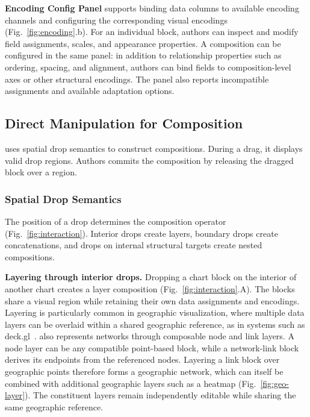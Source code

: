 \textbf{Encoding Config Panel} supports binding data columns to available
encoding channels and configuring the corresponding visual encodings
(Fig.~\ref{fig:encoding}.b). For an individual block, authors can inspect and
modify field assignments, scales, and appearance properties. A composition can
be configured in the same panel: in addition to relationship properties such
as ordering, spacing, and alignment, authors can bind fields to
composition-level axes or other structural encodings. The panel also reports
incompatible assignments and available adaptation options.















\subsection{Direct Manipulation for Composition}

{\system} uses spatial drop semantics to construct compositions. During a drag,
it displays valid drop regions. Authors commits the composition by releasing the
dragged block over a region.

\subsubsection{Spatial Drop Semantics}



The position of a drop determines the composition operator
(Fig.~\ref{fig:interaction}). Interior drops create layers, boundary drops create
concatenations, and drops on internal structural targets create nested
compositions.



\textbf{Layering through interior drops.}
Dropping a chart block on the interior of another chart creates a layer
composition (Fig.~\ref{fig:interaction}.A). The blocks share a visual region
while retaining their own data assignments and encodings. Layering is
particularly common in geographic visualization, where multiple data layers
can be overlaid within a shared geographic reference, as in systems such as
deck.gl~\cite{deckgl}.
{\system} also represents networks through composable node and link layers.
A node layer can be any compatible point-based block, while a network-link
block derives its endpoints from the referenced nodes. Layering a link block
over geographic points therefore forms a geographic network, which can itself
be combined with additional geographic layers such as a heatmap
(Fig.~\ref{fig:geo-layer}). The constituent layers remain independently
editable while sharing the same geographic reference.




